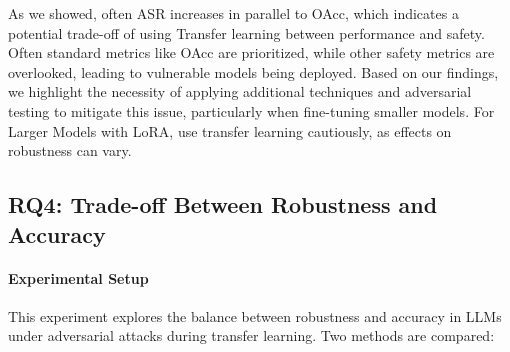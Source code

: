 \documentclass{article}
\begin{document}
As we showed, often ASR increases in parallel to OAcc, which indicates a potential trade-off of using Transfer learning between performance and safety. Often standard metrics like OAcc are prioritized, while other safety metrics are overlooked, leading to vulnerable models being deployed. Based on our findings, we highlight the necessity of applying additional techniques and adversarial testing to mitigate this issue, particularly when fine-tuning smaller models. For Larger Models with LoRA, use transfer learning cautiously, as effects on robustness can vary. 




\subsection{RQ4: Trade-off Between Robustness and Accuracy} \label{trade_off}
\paragraph{Experimental Setup} This experiment explores the balance between robustness and accuracy in LLMs under adversarial attacks during transfer learning. Two methods are compared:
\end{document}
